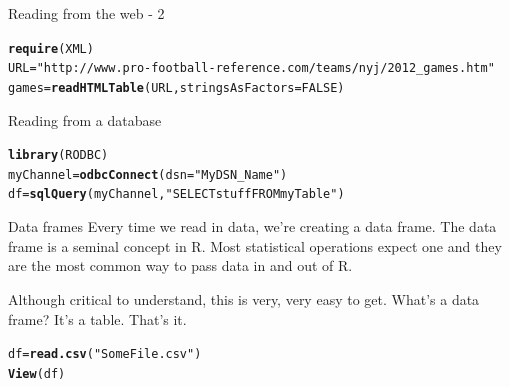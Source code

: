 \documentclass[xcolor=dvipsnames]{beamer}
\makeatletter
\newcommand{\hlnum}[1]{\textcolor[rgb]{0.686,0.059,0.569}{#1}}%
\newcommand{\hlstr}[1]{\textcolor[rgb]{0.192,0.494,0.8}{#1}}%
\newcommand{\hlstd}[1]{\textcolor[rgb]{0.345,0.345,0.345}{#1}}%
\newcommand{\hlkwb}[1]{\textcolor[rgb]{0.69,0.353,0.396}{#1}}%
\newcommand{\hlkwc}[1]{\textcolor[rgb]{0.333,0.667,0.333}{#1}}%
\newcommand{\hlkwd}[1]{\textcolor[rgb]{0.737,0.353,0.396}{\textbf{#1}}}%
\newenvironment{kframe}{%
 \def\at@end@of@kframe{}%
 \ifinner\ifhmode%
  \def\at@end@of@kframe{\end{minipage}}%
  \begin{minipage}{\columnwidth}%
 \fi\fi%
 \def\FrameCommand##1{\hskip\@totalleftmargin \hskip-\fboxsep
 \colorbox{shadecolor}{##1}\hskip-\fboxsep
     \hskip-\linewidth \hskip-\@totalleftmargin \hskip\columnwidth}%
 \MakeFramed {\advance\hsize-\width
   \@totalleftmargin\z@ \linewidth\hsize
   \@setminipage}}%
 {\par\unskip\endMakeFramed%
 \at@end@of@kframe}
\newenvironment{knitrout}{}{} %
\makeatother
\begin{document}
\begin{frame}[fragile]{Reading from the web - 2}
\begin{knitrout}\tiny
{}\color{fgcolor}\begin{kframe}
\begin{alltt}
\hlkwd{require}\hlstd{(XML)}
\hlstd{URL} \hlkwb{=} \hlstr{"http://www.pro-football-reference.com/teams/nyj/2012_games.htm"}
\hlstd{games} \hlkwb{=} \hlkwd{readHTMLTable}\hlstd{(URL,} \hlkwc{stringsAsFactors} \hlstd{=} \hlnum{FALSE}\hlstd{)}
\end{alltt}
\end{kframe}
\end{knitrout}

\end{frame}

\begin{frame}[fragile]{Reading from a database}
\begin{knitrout}
\color{fgcolor}\begin{kframe}
\begin{alltt}
\hlkwd{library}\hlstd{(RODBC)}
\hlstd{myChannel} \hlkwb{=} \hlkwd{odbcConnect}\hlstd{(}\hlkwc{dsn} \hlstd{=} \hlstr{"MyDSN_Name"}\hlstd{)}
\hlstd{df} \hlkwb{=} \hlkwd{sqlQuery}\hlstd{(myChannel,} \hlstr{"SELECT stuff FROM myTable"}\hlstd{)}
\end{alltt}
\end{kframe}
\end{knitrout}

\end{frame}

\begin{frame}[fragile]{Data frames}
Every time we read in data, we're creating a data frame. The data frame is a seminal concept in R. Most statistical operations expect one and they are the most common way to pass data in and out of R.

Although critical to understand, this is very, very easy to get. What's a data frame? It's a table. That's it.
\begin{knitrout}
\color{fgcolor}\begin{kframe}
\begin{alltt}
\hlstd{df} \hlkwb{=} \hlkwd{read.csv}\hlstd{(}\hlstr{"SomeFile.csv"}\hlstd{)}
\hlkwd{View}\hlstd{(df)}
\end{alltt}
\end{kframe}
\end{knitrout}

\end{frame}
\end{document}
